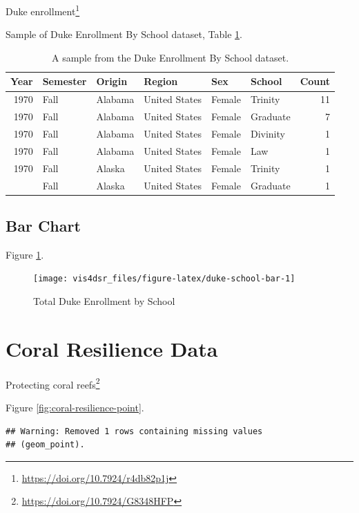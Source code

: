 \documentclass[
]{krantz}
\renewcommand{\href}[2]{#2\footnote{\url{#1}}}
\begin{document}
\href{https://doi.org/10.7924/r4db82p1j}{Duke enrollment}

Sample of Duke Enrollment By School dataset, Table \ref{tab:duke-school-tab}.

\begin{table}

\caption{\label{tab:duke-school-tab}A sample from the Duke Enrollment By School dataset.}
\centering
\begin{tabular}[t]{rlllllr}
\toprule
Year & Semester & Origin & Region & Sex & School & Count\\
\midrule
1970 & Fall & Alabama & United States & Female & Trinity & 11\\
1970 & Fall & Alabama & United States & Female & Graduate & 7\\
1970 & Fall & Alabama & United States & Female & Divinity & 1\\
1970 & Fall & Alabama & United States & Female & Law & 1\\
1970 & Fall & Alaska & United States & Female & Trinity & 1\\
\addlinespace
1970 & Fall & Alaska & United States & Female & Graduate & 1\\
\bottomrule
\end{tabular}
\end{table}

\hypertarget{bar-chart-1}{%
\subsection*{Bar Chart}\label{bar-chart-1}}


Figure \ref{fig:duke-school-bar}.

\begin{figure}
\texttt{[image: vis4dsr\_files/figure-latex/duke-school-bar-1]} \caption{Total Duke Enrollment by School}\label{fig:duke-school-bar}
\end{figure}

\hypertarget{coral-resilience-data}{%
\section*{Coral Resilience Data}\label{coral-resilience-data}}


\href{https://doi.org/10.7924/G8348HFP}{Protecting coral reefs}

Figure \ref{fig:coral-resilience-point}.

\begin{verbatim}
## Warning: Removed 1 rows containing missing values
## (geom_point).
\end{verbatim}
\end{document}
